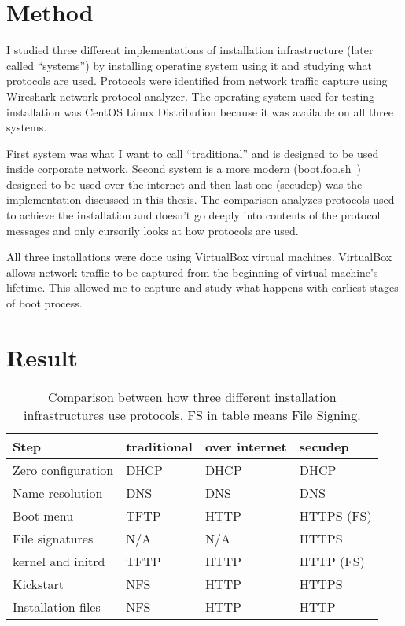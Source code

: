 
\section{Method}

I studied three different implementations of installation
infrastructure (later called ``systems'') by installing operating
system using it and studying what protocols are used. Protocols were
identified from network traffic capture using Wireshark network
protocol analyzer. The operating system used for testing installation
was CentOS Linux Distribution because it was available on all three
systems.

First system was what I want to call ``traditional'' and is designed
to be used inside corporate network. Second system is a more modern
(boot.foo.sh~\cite{boot-foo-sh}) designed to be used over the internet
and then last one (secudep) was the implementation discussed in this
thesis. The comparison analyzes protocols used to achieve the
installation and doesn't go deeply into contents of the protocol
messages and only cursorily looks at how protocols are used.

All three installations were done using VirtualBox virtual
machines. VirtualBox allows network traffic to be captured from the
beginning of virtual machine's lifetime. This allowed me to capture
and study what happens with earliest stages of boot process.

\section{Result}

\begin{table}[!ht]
  \def\arraystretch{1.1}%
  \begin{center}
    \begin{tabular}{| l | l | l | l |}
      \hline
      Step               & traditional & over internet & secudep    \\
      \hline
      Zero configuration & DHCP        & DHCP          & DHCP       \\
      Name resolution    & DNS         & DNS           & DNS        \\
      Boot menu          & TFTP        & HTTP          & HTTPS (FS) \\
      File signatures    & N/A         & N/A           & HTTPS      \\
      kernel and initrd  & TFTP        & HTTP          & HTTP (FS)  \\
      Kickstart          & NFS         & HTTP          & HTTPS      \\
      Installation files & NFS         & HTTP          & HTTP       \\
      \hline
    \end{tabular}
    \caption{Comparison between how three different installation
      infrastructures use protocols. FS in table means File Signing.}
    \label{tab:comparison_table}
  \end{center}
\end{table}

